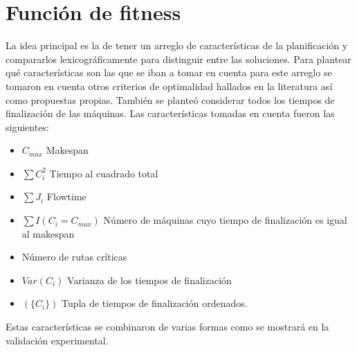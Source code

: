 \section{Función de fitness}\label{prop:fitness}
La idea principal es la de tener un arreglo de características de la planificación y compararlos lexicográficamente para distinguir entre las soluciones. Para plantear qué características son las que se iban a tomar en cuenta para este arreglo se tomaron en cuenta otros criterios de optimalidad hallados en la literatura así como propuestas propias. También se planteó considerar todos los tiempos de finalización de las máquinas. Las características tomadas en cuenta fueron las siguientes:
\begin{itemize}
\item $C_{max}$ Makespan 
\item $\sum C_i^2$ Tiempo al cuadrado total 
\item $\sum J_i$ Flowtime 
\item $\sum I(C_i=C_{max})$ Número de máquinas cuyo tiempo de finalización es igual al makespan 
\item Número de rutas críticas 
\item $Var(C_i)$ Varianza de los tiempos de finalización 
\item $(\{C_i\})$ Tupla de tiempos de finalización ordenados.
\end{itemize}

Estas características se combinaron de varias formas como se mostrará en la validación experimental. 
